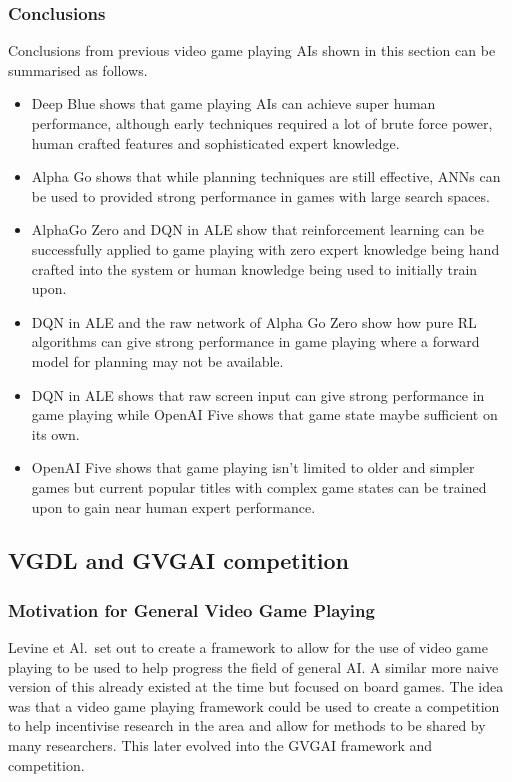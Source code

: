 \documentclass[a4paper]{article}
\begin{document}
\subsubsection{Conclusions}
Conclusions from previous video game playing AIs shown in this section can be summarised as follows.
\begin{itemize}[noitemsep,nolistsep]
    \item Deep Blue shows that game playing AIs can achieve super human performance, although early techniques required a lot of brute force power, human crafted features and sophisticated expert knowledge.
    \item Alpha Go shows that while planning techniques are still effective, ANNs can be used to provided strong performance in games with large search spaces.
    \item AlphaGo Zero and DQN in ALE show that reinforcement learning can be successfully applied to game playing with zero expert knowledge being hand crafted into the system or human knowledge being used to initially train upon.
    \item DQN in ALE and the raw network of Alpha Go Zero show how pure RL algorithms can give strong performance in game playing where a forward model for planning may not be available.
    \item DQN in ALE shows that raw screen input can give strong performance in game playing while OpenAI Five shows that game state maybe sufficient on its own.
    \item OpenAI Five shows that game playing isn't limited to older and simpler games but current popular titles with complex game states can be trained upon to gain near human expert performance.
\end{itemize}

\subsection{VGDL and GVGAI competition}
\subsubsection{Motivation for General Video Game Playing}
Levine et Al.\ set out to create a framework to allow for the use of video game playing to be used to help progress the field of general AI\cite{GVGP}.
A similar more naive version of this already existed at the time but focused on board games.
The idea was that a video game playing framework could be used to create a competition to help incentivise research in the area and allow for methods to be shared by many researchers.
This later evolved into the GVGAI framework and competition.
\end{document}
